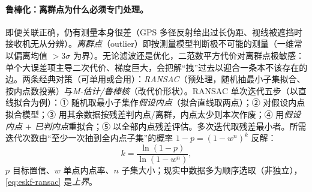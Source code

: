 \paragraph{鲁棒化：离群点为什么必须专门处理。}
即便关联正确，仍有测量本身很差（GPS 多径反射给出过长伪距、视线被遮挡时接收机无从分辨）。\emph{离群点}（outlier）即按测量模型判断极不可能的测量（一维常以偏离均值 $>3\sigma$ 为界）。无论滤波还是优化，二范数平方代价对离群点极敏感：单个大误差项主导二次代价、梯度巨大，会把解“拽”过去以迎合一条本不该存在的边\cite{gaoxiang2019slam14}。两条经典对策（可单用或合用）\cite{barfoot2024state}：\emph{RANSAC}（预处理，随机抽最小子集拟合、按内点数投票）与\emph{M-估计/鲁棒核}（改代价形状）。RANSAC 单次迭代五步（以直线拟合为例）：① 随机取最小子集作\emph{假设内点}（拟合直线取两点）；② 对假设内点拟合模型；③ 用其余数据按残差判内点/离群，内点太少则本次作废；④ 用\emph{假设内点 $+$ 已判内点}重拟合；⑤ 以全部内点残差评估。多次迭代取残差最小者。所需迭代次数由“至少一次抽到全内点子集”的概率 $1-p=(1-w^n)^k$ 反解：
\begin{equation}
  k=\frac{\ln(1-p)}{\ln(1-w^n)},
  \label{eq:eskf-ransac}
\end{equation}
$p$ 目标置信、$w$ 单点内点率、$n$ 子集大小；现实中数据多为顺序选取（非独立），\cref{eq:eskf-ransac} 是\emph{上界}。

